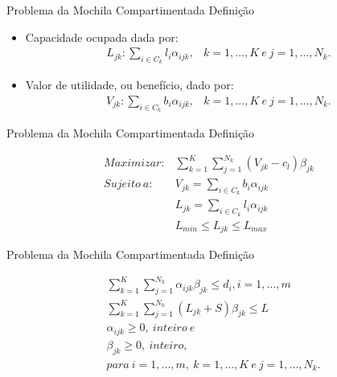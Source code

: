 \documentclass[slidestop,compress,mathserif]{beamer}
\begin{document}
\begin{frame} {Problema da Mochila Compartimentada} {Definição}

\begin{itemize}
	\item Capacidade ocupada dada por:
	\begin{eqnarray}
		L_{jk}: \sum_{i \in C_{k}}l_{i}\alpha_{ijk}, & k = 1, ..., K \ e \ j = 1, ..., N_{k}.
	\end{eqnarray}

	\item Valor de utilidade, ou benefício, dado por:
	\begin{eqnarray}
		V_{jk}: \sum_{i \in C_{k}}b_{i}\alpha_{ijk}, & k = 1, ..., K \ e \ j = 1, ..., N_{k}.
	\end{eqnarray}

\end{itemize} 

\end{frame}

\begin{frame} {Problema da Mochila Compartimentada} {Definição}


\begin{eqnarray}
	Maximizar: & \displaystyle \sum_{k = 1}^{K}\sum_{j = 1}^{N_{k}}(V_{jk} - c_{l})\beta_{jk} \\
	Sujeito \ a: &  \displaystyle V_{jk} = \sum_{i \in C_{k}}b_{i}\alpha_{ijk}\\
	& \displaystyle L_{jk} = \sum_{i \in C_{k}}l_{i}\alpha_{ijk} \\
	& \displaystyle L_{min} \leq L_{jk} \leq L_{max} 
\end{eqnarray}

\end{frame}


\begin{frame} {Problema da Mochila Compartimentada} {Definição}

\begin{eqnarray}
	& \displaystyle \sum_{k = 1}^{K}\sum_{j = 1}^{N_{k}}\alpha_{ijk}\beta_{jk} \leq d_{i}, i = 1, ..., m \\
	& \displaystyle \sum_{k = 1}^{K}\sum_{j = 1}^{N_{k}}(L_{jk} + S)\beta_{jk} \leq L \\
	& \displaystyle \alpha_{ijk} \geq 0, \ inteiro \ e \nonumber\\
	& \displaystyle \beta_{jk} \geq 0, \ inteiro, \nonumber\\
	& \displaystyle para \ i = 1, ..., m, \ k = 1, ..., K \ e \ j = 1, ..., N_{k}. \nonumber
\end{eqnarray}

\end{frame}
\end{document}
